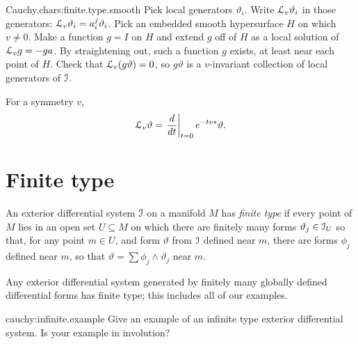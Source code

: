 \begin{answer}{Cauchy.chars:finite.type.smooth}
Pick local generators \(\vartheta_i\).
Write \(\EuScript L_v\vartheta_i\) in those generators: \(\EuScript L_v\vartheta_i=a^j_i\vartheta_i\).
Pick an embedded smooth hypersurface \(H\) on which \(v\ne0\).
Make a function \(g=I\) on \(H\) and extend \(g\) off of \(H\) as a local solution of \(\EuScript L_v g = -ga\).
By straightening out, such a function \(g\) exists, at least near each point of \(H\).
Check that \(\EuScript L_v (g\vartheta)=0\), so \(g\vartheta\) is a \(v\)-invariant collection of local generators of \(\mathcal{I}\).

For a symmetry \(v\),
\[
\EuScript L_v \vartheta=\left.\frac{d}{dt}\right|_{t=0} e^{-tv*}\vartheta.
\]
\end{answer}

\section{Finite type}
An exterior differential system \(\mathcal{I}\) on a manifold \(M\) has \emph{finite type} if every point of \(M\) lies in an open set \(U\subseteq M\) on which there are finitely many forms \(\vartheta_j \in \mathcal{I}_U\) so that, for any point \(m \in U\), and form \(\vartheta\) from \(\mathcal{I}\) defined near \(m\), there are forms \(\phi_j\) defined near \(m\), so that \(\vartheta=\sum \phi_j \wedge \vartheta_j\) near \(m\).
\begin{example}
Any exterior differential system generated by finitely many globally defined differential forms has finite type; this includes all of our examples.
\end{example}
\begin{problem}{cauchy:infinite.example}
Give an example of an infinite type exterior differential system.
Is your example in involution?
\end{problem}
